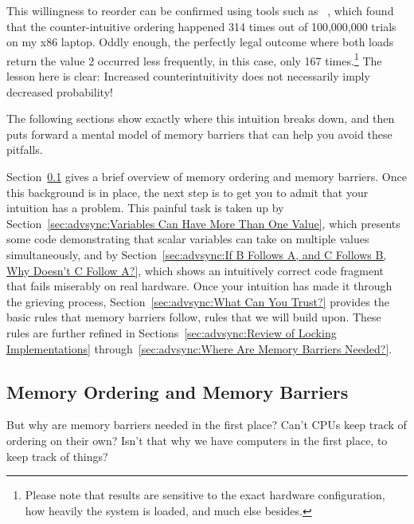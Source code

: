 This willingness to reorder can be confirmed using tools such as
~\cite{Alglave:2014:HCM:2594291.2594347},
which found that the counter-intuitive ordering happened
314 times out of 100,000,000 trials on my x86 laptop.
Oddly enough, the perfectly legal outcome where both loads return the
value 2 occurred less frequently, in this case, only 167 times.\footnote{
	Please note that results are sensitive to the exact hardware
	configuration,
	how heavily the system is loaded, and much else besides.}
The lesson here is clear: Increased counterintuitivity does not necessarily
imply decreased probability!

The following sections show exactly where this intuition breaks down,
and then puts forward a mental model of memory barriers that can help
you avoid these pitfalls.

Section~\ref{sec:advsync:Memory Ordering and Memory Barriers}
gives a brief overview of memory ordering and memory barriers.
Once this background is in place, the next step is to get you to admit
that your intuition has a problem.
This painful task is taken up by
Section~\ref{sec:advsync:Variables Can Have More Than One Value},
which presents some code demonstrating that scalar variables can
take on multiple values simultaneously,
and by
Section~\ref{sec:advsync:If B Follows A, and C Follows B, Why Doesn't C Follow A?},
which shows an intuitively correct code fragment that fails miserably
on real hardware.
Once your intuition has made it through the grieving process,
Section~\ref{sec:advsync:What Can You Trust?}
provides the basic rules that memory barriers follow, rules that we
will build upon.
These rules are further refined in
Sections~\ref{sec:advsync:Review of Locking Implementations}
through~\ref{sec:advsync:Where Are Memory Barriers Needed?}.

\subsection{Memory Ordering and Memory Barriers}
\label{sec:advsync:Memory Ordering and Memory Barriers}

But why are memory barriers needed in the first place?
Can't CPUs keep track of ordering on their own?
Isn't that why we have computers in the first place, to keep track of things?

